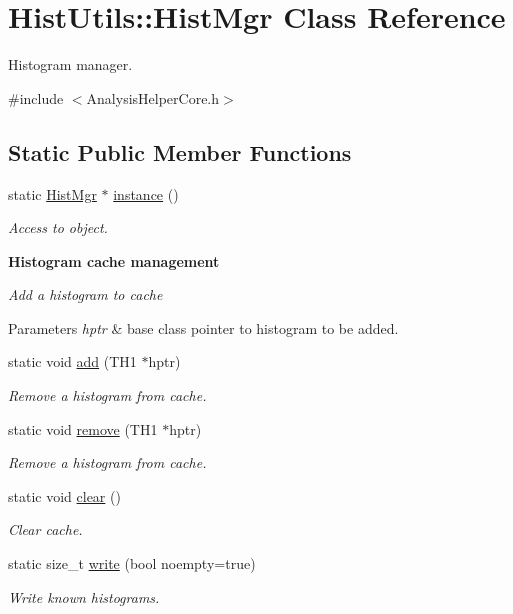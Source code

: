 \hypertarget{classHistUtils_1_1HistMgr}{}\section{Hist\+Utils\+:\+:Hist\+Mgr Class Reference}
\label{classHistUtils_1_1HistMgr}


Histogram manager.  




{\ttfamily \#include $<$Analysis\+Helper\+Core.\+h$>$}

\subsection*{Static Public Member Functions}
\begin{DoxyCompactItemize}
\item 
static \hyperlink{classHistUtils_1_1HistMgr}{Hist\+Mgr} $\ast$ \hyperlink{classHistUtils_1_1HistMgr_a470a4d54f8b7f7e305aa43fb48f99e9c}{instance} ()
\begin{DoxyCompactList}\small\item\em Access to object. \end{DoxyCompactList}\end{DoxyCompactItemize}
\begin{Indent}{\bf Histogram cache management}\par
{\em Add a histogram to cache


\begin{DoxyParams}{Parameters}
{\em hptr} & base class pointer to histogram to be added. \\
\hline
\end{DoxyParams}
}\begin{DoxyCompactItemize}
\item 
static void \hyperlink{classHistUtils_1_1HistMgr_a0ddb91771b282ca41a4b7b916f8e7e2c}{add} (T\+H1 $\ast$hptr)
\begin{DoxyCompactList}\small\item\em Remove a histogram from cache. \end{DoxyCompactList}\item 
static void \hyperlink{classHistUtils_1_1HistMgr_a0f2238621b12aa2e768f804344d15915}{remove} (T\+H1 $\ast$hptr)
\begin{DoxyCompactList}\small\item\em Remove a histogram from cache. \end{DoxyCompactList}\item 
static void \hyperlink{classHistUtils_1_1HistMgr_a43c6a46f880d56f843ecf0b6d920426d}{clear} ()
\begin{DoxyCompactList}\small\item\em Clear cache. \end{DoxyCompactList}\item 
static size\+\_\+t \hyperlink{classHistUtils_1_1HistMgr_a9af371f98ca15a96b7090e6ab3785998}{write} (bool noempty=true)
\begin{DoxyCompactList}\small\item\em Write known histograms. \end{DoxyCompactList}\end{DoxyCompactItemize}
\end{Indent}
